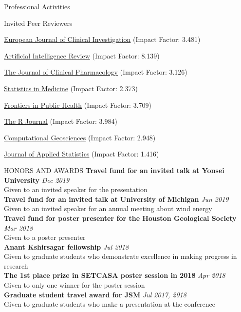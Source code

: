 \documentclass[
	11pt, %
]{resume} %
\begin{document}
\begin{rSection}{Professional Activities}
\begin{rSubsection}{
Invited Peer Reviewers}{}{}{}
\item \href{https://onlinelibrary.wiley.com/journal/13652362}{European Journal of Clinical Investigation} (Impact Factor: 3.481)
\item \href{https://www.springer.com/journal/10462}{Artificial Intelligence Review} (Impact Factor: 8.139)
\item \href{https://accp1.onlinelibrary.wiley.com/journal/15524604}{The Journal of Clinical Pharmacology} (Impact Factor: 3.126)
\item \href{https://onlinelibrary.wiley.com/journal/10970258}{Statistics in Medicine} (Impact Factor: 2.373)
\item \href{https://www.frontiersin.org/journals/public-health}{Frontiers in Public Health} (Impact Factor: 3.709)
\item \href{https://journal.r-project.org/}{The R Journal} (Impact Factor: 3.984)
\item \href{https://www.springer.com/journal/10596}{Computational Geosciences} (Impact Factor: 2.948)
\item \href{https://www.tandfonline.com/journals/cjas20}{Journal of Applied Statistics} (Impact Factor: 1.416)
\end{rSubsection}
\end{rSection}


\begin{rSection}{HONORS AND AWARDS}
{\bf Travel fund for an invited talk at Yonsei University} \hfill {\em Dec 2019} \\ 
Given to an invited speaker for the presentation
\\
{\bf Travel fund for an invited talk at University of Michigan} \hfill {\em Jun 2019} \\ 
Given to an invited speaker for an annual meeting about wind energy
\\
{\bf Travel fund for poster presenter for the Houston Geological Society} \hfill {\em Mar 2018} \\ 
Given to a poster presenter 
\\
{\bf Anant Kshirsagar fellowship} \hfill {\em Jul 2018} \\ 
Given to graduate students who demonstrate excellence in making progress in research
\\
{\bf The 1st place prize in SETCASA poster session in 2018 } \hfill {\em Apr 2018} \\ 
Given to only one winner for the poster session 
\\
{\bf Graduate student travel award for JSM} \hfill {\em Jul 2017, 2018} \\ 
Given to graduate students who make a presentation at the conference
\end{rSection}
\end{document}
